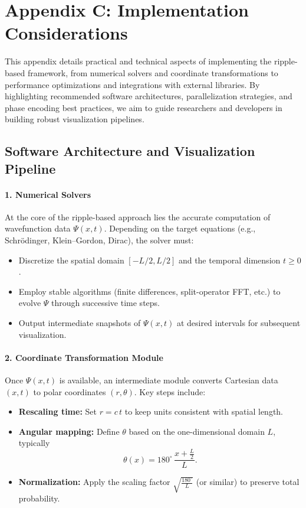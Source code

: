 \documentclass{article}
\begin{document}
\newpage

\section{Appendix C: Implementation Considerations}
\label{appendix:C}

This appendix details practical and technical aspects of implementing the ripple-based framework, from numerical solvers and coordinate transformations to performance optimizations and integrations with external libraries. By highlighting recommended software architectures, parallelization strategies, and phase encoding best practices, we aim to guide researchers and developers in building robust visualization pipelines.

\subsection{Software Architecture and Visualization Pipeline}

\paragraph{1. Numerical Solvers}
At the core of the ripple-based approach lies the accurate computation of wavefunction data \(\Psi(x,t)\). Depending on the target equations (e.g., Schr\"odinger, Klein--Gordon, Dirac), the solver must:
\begin{itemize}
    \item Discretize the spatial domain \([-L/2, L/2]\) and the temporal dimension \(t \ge 0\).
    \item Employ stable algorithms (finite differences, split-operator FFT, etc.) to evolve \(\Psi\) through successive time steps.
    \item Output intermediate snapshots of \(\Psi(x,t)\) at desired intervals for subsequent visualization.
\end{itemize}

\paragraph{2. Coordinate Transformation Module}
Once \(\Psi(x,t)\) is available, an intermediate module converts Cartesian data \((x,t)\) to polar coordinates \((r,\theta)\). Key steps include:
\begin{itemize}
    \item \textbf{Rescaling time:} Set \(r = c \, t\) to keep units consistent with spatial length.
    \item \textbf{Angular mapping:} Define \(\theta\) based on the one-dimensional domain \(L\), typically
    \[
       \theta(x) = 180^\circ \,\frac{x + \tfrac{L}{2}}{L}.
    \]
    \item \textbf{Normalization:} Apply the scaling factor \(\sqrt{\tfrac{180^\circ}{L}}\) (or similar) to preserve total probability.
\end{itemize}
\end{document}
